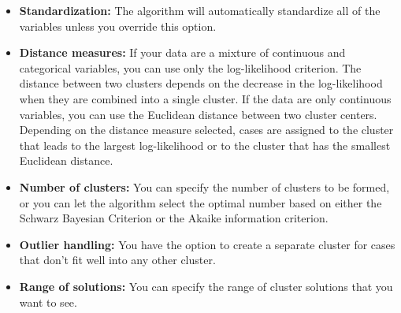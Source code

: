 \documentclass[a4paper,12pt]{article}
\begin{document}
\begin{itemize}
	\item \textbf{Standardization:} The algorithm will automatically standardize all of the variables
	unless you override this option.
	\item \textbf{Distance measures:} If your data are a mixture of continuous and categorical variables,
	you can use only the log-likelihood criterion. The distance between two clusters
	depends on the decrease in the log-likelihood when they are combined into a single
	cluster. If the data are only continuous variables, you can use the Euclidean
	distance between two cluster centers. Depending on the distance measure selected,
	cases are assigned to the cluster that leads to the largest log-likelihood or to the cluster
	that has the smallest Euclidean distance.
	
	
\item \textbf{Number of clusters:} You can specify the number of clusters to be formed, or you can let
	the algorithm select the optimal number based on either the Schwarz Bayesian
	Criterion or the Akaike information criterion.
	
	
\item \textbf{Outlier handling:} You have the option to create a separate cluster for cases that don't fit
	well into any other cluster.
	\item 
	\textbf{Range of solutions:} You can specify the range of cluster solutions that you want to see.
\end{itemize}
\end{document}
